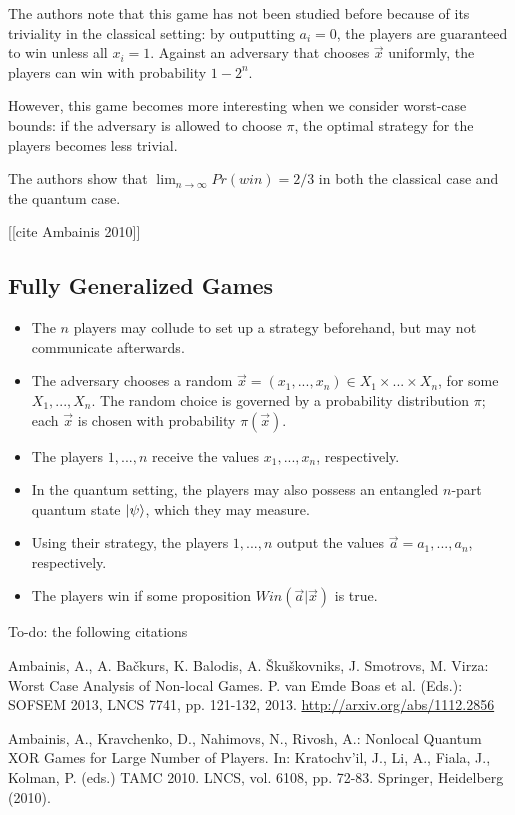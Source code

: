 The authors note that this game has not been studied before because of its triviality in the classical setting: by outputting $a_i=0$, the players are guaranteed to win unless all $x_i=1$. Against an adversary that chooses $\vec{x}$ uniformly, the players can win with probability $1-2^n$.

However, this game becomes more interesting when we consider worst-case bounds: if the adversary is allowed to choose $\pi$, the optimal strategy for the players becomes less trivial.

The authors show that $\lim_{n \rightarrow \infty}Pr(win) = 2/3$ in both the classical case and the quantum case. 

[[cite Ambainis 2010]]


\subsection{Fully Generalized Games}

\begin{itemize}
\item{The $n$ players may collude to set up a strategy beforehand, but may not communicate afterwards.}
\item{The adversary chooses a random $\vec{x}=(x_1, ..., x_n) \in X_1 \times ... \times X_n$, for some $X_1, ..., X_n$. The random choice is governed by a probability distribution $\pi$; each $\vec{x}$ is chosen with probability $\pi(\vec{x})$.}
\item{The players $1, ..., n$ receive the values $x_1, ..., x_n$, respectively.}
\item{In the quantum setting, the players may also possess an entangled $n$-part quantum state $\ket{\psi}$, which they may measure.}
\item{Using their strategy, the players $1, ..., n$ output the values $\vec{a} = a_1, ..., a_n$, respectively.}
\item{The players win if some proposition $Win(\vec{a} | \vec{x})$ is true.}
\end{itemize}




To-do: the following citations

Ambainis, A., A. Ba\v{c}kurs, K. Balodis, A. \v{S}ku\v{s}kovniks, J. Smotrovs, M. Virza: Worst Case Analysis of Non-local Games. P. van Emde Boas et al. (Eds.): SOFSEM 2013, LNCS 7741, pp. 121-132, 2013. \url{http://arxiv.org/abs/1112.2856}

Ambainis, A., Kravchenko, D., Nahimovs, N., Rivosh, A.: Nonlocal Quantum XOR Games for Large Number of Players. In: Kratochv\a'il, J., Li, A., Fiala, J., Kolman, P. (eds.) TAMC 2010. LNCS, vol. 6108, pp. 72-83. Springer, Heidelberg (2010).

